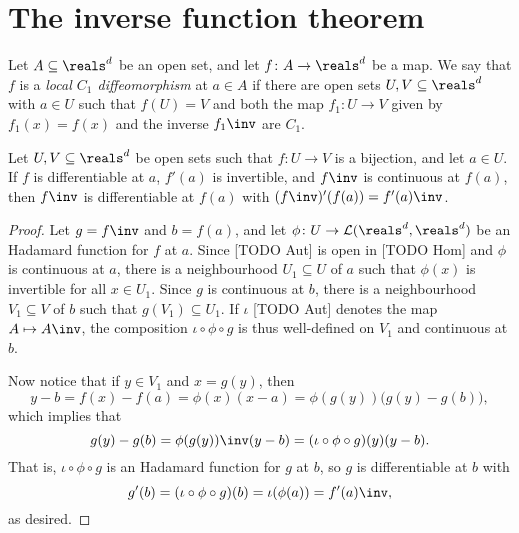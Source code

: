 \documentclass[article, a4paper, 11pt, oneside]{memoir}
\numberwithin{equation}{chapter}
\newcommand{\calL}{\mathcal{L}}
\begin{document}
\section{The inverse function theorem}

Let $A \subseteq \reals^d$ be an open set, and let $f \colon A \to \reals^d$ be a map. We say that $f$ is a \emph{local $C_1$ diffeomorphism} at $a \in A$ if there are open sets $U,V \subseteq \reals^d$ with $a \in U$ such that $f(U) = V$ and both the map $f_1 \colon U \to V$ given by $f_1(x) = f(x)$ and the inverse $f_1\inv$ are $C_1$.


\begin{lemma}
    Let $U, V \subseteq \reals^d$ be open sets such that $f \colon U \to V$ is a bijection, and let $a \in U$. If $f$ is differentiable at $a$, $f'(a)$ is invertible, and $f\inv$ is continuous at $f(a)$, then $f\inv$ is differentiable at $f(a)$ with $(f\inv)'(f(a)) = f'(a)\inv$.
\end{lemma}

\begin{proof}
    Let $g = f\inv$ and $b = f(a)$, and let $\phi \colon U \to \calL(\reals^d,\reals^d)$ be an Hadamard function for $f$ at $a$. Since [TODO Aut] is open in [TODO Hom] and $\phi$ is continuous at $a$, there is a neighbourhood $U_1 \subseteq U$ of $a$ such that $\phi(x)$ is invertible for all $x \in U_1$. Since $g$ is continuous at $b$, there is a neighbourhood $V_1 \subseteq V$ of $b$ such that $g(V_1) \subseteq U_1$. If $\iota$ [TODO Aut] denotes the map $A \mapsto A\inv$, the composition $\iota \circ \phi \circ g$ is thus well-defined on $V_1$ and continuous at $b$.

    Now notice that if $y \in V_1$ and $x = g(y)$, then
    \begin{equation*}
        y - b
            = f(x) - f(a)
            = \phi(x) (x - a)
            = \phi(g(y)) \bigl( g(y) - g(b) \bigr),
    \end{equation*}
    which implies that
    \begin{equation*}
        g(y) - g(b)
            = \phi(g(y))\inv (y - b)
            = (\iota \circ \phi \circ g)(y) (y - b).
    \end{equation*}
    That is, $\iota \circ \phi \circ g$ is an Hadamard function for $g$ at $b$, so $g$ is differentiable at $b$ with
    \begin{equation*}
        g'(b)
            = (\iota \circ \phi \circ g)(b)
            = \iota(\phi(a))
            = f'(a)\inv,
    \end{equation*}
    as desired.
\end{proof}
\end{document}
